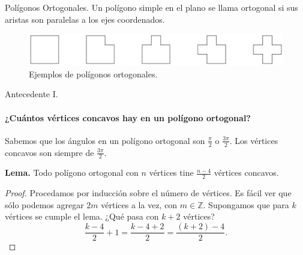 \begin{frame}{Polígonos Ortogonales.} %
  Un polígono simple en el plano se llama ortogonal si sus aristas son paralelas a los
  ejes coordenados.
  
  \begin{figure}
    \centering
    \includegraphics[width=.8 \paperwidth]{./images/EOrtogonales.png}
    \caption*{Ejemplos de polígonos ortogonales.}
  \end{figure}
\end{frame}

\begin{frame}{Antecedente I.} %
  \framesubtitle{¿Cuántos vértices concavos hay en un polígono ortogonal?} %
  Sabemos que los ángulos en un polígono ortogonal son $\frac{\pi}{2}$ o $\frac{3\pi}{2}$. Los vértices
  concavos son siempre de $\frac{3\pi}{2}$. \newline
  
  \textbf{Lema.} Todo polígono ortogonal con $n$ vértices tine
  $\frac{n - 4}{2}$
  vértices concavos.
  
  \begin{proof}
    Procedamos por inducción sobre el número de vértices. Es fácil ver que sólo podemos agregar $2m$ vértices
    a la vez, con $m \in \mathbb{Z}$. Supongamos que para $k$ vértices se cumple el lema. ¿Qué pasa con $k + 2$
    vértices?
    \[\frac{k - 4}{2} + 1 = \frac{k - 4 + 2}{2} = \frac{(k + 2) - 4}{2}.\]
  \end{proof}
\end{frame}


